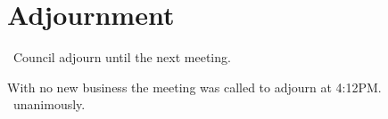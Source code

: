 \section*{Adjournment}

\begin{motion}
    \birt\ Council adjourn until the next meeting.
    \movers{\elizebeth}{\senecca}

    With no new business the meeting was called to adjourn at 4:12PM.%
    \carries\ unanimously.
\end{motion}

